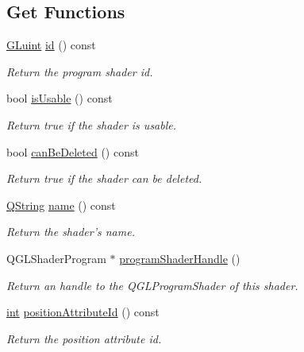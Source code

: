 \subsection*{Get Functions}
\begin{DoxyCompactItemize}
\item 
\hyperlink{glext_8h_a2f0c8cd5c21f9fcbd931c3f48bc90dfc}{G\-Luint} \hyperlink{class_g_l_c___shader_a5470c755077fd0c688d2eee3d042af2a}{id} () const 
\begin{DoxyCompactList}\small\item\em Return the program shader id. \end{DoxyCompactList}\item 
bool \hyperlink{class_g_l_c___shader_ac8f8b534929bb64de2bafb8c598a6319}{is\-Usable} () const 
\begin{DoxyCompactList}\small\item\em Return true if the shader is usable. \end{DoxyCompactList}\item 
bool \hyperlink{class_g_l_c___shader_a28343c78d5bedf6afe411db58fbd3665}{can\-Be\-Deleted} () const 
\begin{DoxyCompactList}\small\item\em Return true if the shader can be deleted. \end{DoxyCompactList}\item 
\hyperlink{group___u_a_v_objects_plugin_gab9d252f49c333c94a72f97ce3105a32d}{Q\-String} \hyperlink{class_g_l_c___shader_a25ac3fe4bb86d7c8d6c255aec7fe52ed}{name} () const 
\begin{DoxyCompactList}\small\item\em Return the shader's name. \end{DoxyCompactList}\item 
Q\-G\-L\-Shader\-Program $\ast$ \hyperlink{class_g_l_c___shader_ae9ae9f0c35e2526908828d1552a6d262}{program\-Shader\-Handle} ()
\begin{DoxyCompactList}\small\item\em Return an handle to the Q\-G\-L\-Program\-Shader of this shader. \end{DoxyCompactList}\item 
\hyperlink{ioapi_8h_a787fa3cf048117ba7123753c1e74fcd6}{int} \hyperlink{class_g_l_c___shader_ae8b6da7b033d6d9abfcd7252df992601}{position\-Attribute\-Id} () const 
\begin{DoxyCompactList}\small\item\em Return the position attribute id. \end{DoxyCompactList}\item 

\end{DoxyCompactItemize}
